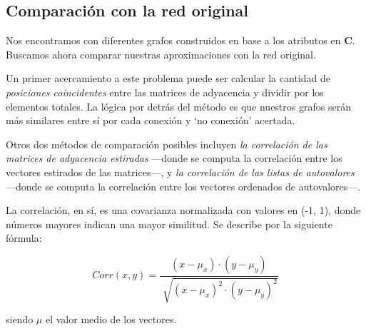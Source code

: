 
\vspace{2em}
\subsection{Comparación con la red original}


Nos encontramos con diferentes grafos construidos en base a los atributos en \textbf{C}. Buscamos ahora comparar nuestras aproximaciones con la red original. 

\vspace{1em}
Un primer acercamiento a este problema puede ser calcular la cantidad de \textit{posiciones coincidentes} entre las matrices de adyacencia y dividir por los elementos totales. La lógica por detrás del método es que nuestros grafos serán más similares entre sí por cada conexión y `no conexión' acertada. %

Otros dos métodos de comparación posibles incluyen \textit{la correlación de las matrices de adyacencia estiradas} ---donde se computa la correlación entre los vectores estirados de las matrices---, y \textit{la correlación de las listas de autovalores} ---donde se computa la correlación entre los vectores ordenados de autovalores---. 

La correlación, en sí, es una covarianza normalizada con valores en (-1, 1), donde números mayores indican una mayor similitud. Se describe por la siguiente fórmula:

\vspace{1em}
\begin{equation}
    Corr(x, y) = \frac{(x - \mu_{x}) \cdot (y - \mu_{y})}{\sqrt[]{(x - \mu_{x})^{2} \cdot (y - \mu_{y})^{2}}}
    \label{eq:corr}
\end{equation}

\vspace{1em}
\noindent siendo $\mu$ el valor medio de los vectores.

